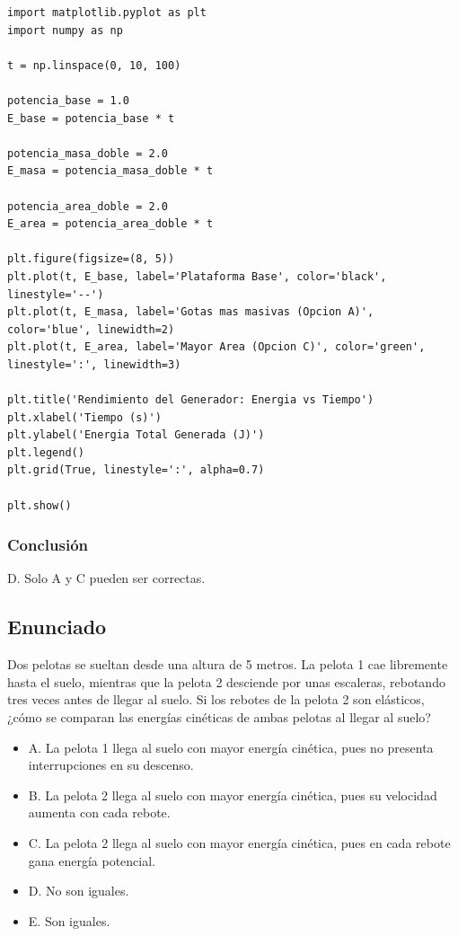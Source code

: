 \documentclass[12pt, a4paper]{article}
\begin{document}
\begin{lstlisting}
import matplotlib.pyplot as plt
import numpy as np

t = np.linspace(0, 10, 100)

potencia_base = 1.0
E_base = potencia_base * t

potencia_masa_doble = 2.0 
E_masa = potencia_masa_doble * t

potencia_area_doble = 2.0
E_area = potencia_area_doble * t

plt.figure(figsize=(8, 5))
plt.plot(t, E_base, label='Plataforma Base', color='black', linestyle='--')
plt.plot(t, E_masa, label='Gotas mas masivas (Opcion A)', color='blue', linewidth=2)
plt.plot(t, E_area, label='Mayor Area (Opcion C)', color='green', linestyle=':', linewidth=3)

plt.title('Rendimiento del Generador: Energia vs Tiempo')
plt.xlabel('Tiempo (s)')
plt.ylabel('Energia Total Generada (J)')
plt.legend()
plt.grid(True, linestyle=':', alpha=0.7)

plt.show()
\end{lstlisting}

\subsubsection*{Conclusión}

D. Solo A y C pueden ser correctas.


\newpage

\subsection*{Enunciado}

Dos pelotas se sueltan desde una altura de 5 metros. La pelota 1 cae libremente hasta el suelo, mientras que la pelota 2 desciende por unas escaleras, rebotando tres veces antes de llegar al suelo. Si los rebotes de la pelota 2 son elásticos, ¿cómo se comparan las energías cinéticas de ambas pelotas al llegar al suelo?

\begin{itemize}
    \item A. La pelota 1 llega al suelo con mayor energía cinética, pues no presenta interrupciones en su descenso.
    \item B. La pelota 2 llega al suelo con mayor energía cinética, pues su velocidad aumenta con cada rebote.
    \item C. La pelota 2 llega al suelo con mayor energía cinética, pues en cada rebote gana energía potencial.
    \item D. No son iguales.
    \item E. Son iguales.
\end{itemize}
\end{document}
